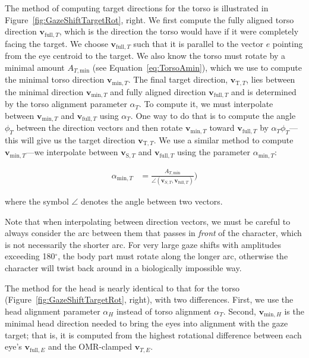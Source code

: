 The method of computing target directions for the torso is illustrated in Figure~\ref{fig:GazeShiftTargetRot}, right. We first compute the fully aligned torso direction $\mathbf{v}_{\mathrm{full},T}$, which is the direction the torso would have if it were completely facing the target. We choose $\mathbf{v}_{\mathrm{full},T}$ such that it is parallel to the vector $e$ pointing from the eye centroid to the target. We also know the torso must rotate by a minimal amount $A_{T,\mathrm{min}}$ (see Equation~\ref{eq:TorsoAmin}), which we use to compute the minimal torso direction $\mathbf{v}_{\mathrm{min},T}$. The final target direction, $\mathbf{v}_{\mathrm{T},T}$, lies between the minimal direction $\mathbf{v}_{\mathrm{min},T}$ and fully aligned direction $\mathbf{v}_{\mathrm{full},T}$ and is determined by the torso alignment parameter $\alpha_T$. To compute it, we must interpolate between $\mathbf{v}_{\mathrm{min},T}$ and $\mathbf{v}_{\mathrm{full},T}$ using $\alpha_T$. One way to do that is to compute the angle $\phi_T$ between the direction vectors and then rotate $\mathbf{v}_{\mathrm{min},T}$ toward $\mathbf{v}_{\mathrm{full},T}$ by $\alpha_T \phi_T$---this will give us the target direction $\mathbf{v}_{\mathrm{T},T}$. We use a similar method to compute $\mathbf{v}_{\mathrm{min},T}$---we interpolate between $\mathbf{v}_{\mathrm{S},T}$ and $\mathbf{v}_{\mathrm{full},T}$ using the parameter $\alpha_{\mathrm{min},T}$:

\begin{align}
\label{eq:TorsoMinRotParam}
\alpha_{\mathrm{min},T} &= \frac{A_{T,\mathrm{min}}}{\angle(\mathbf{v}_{S,T}, \mathbf{v}_{\mathrm{full},T})})
\end{align}

where the symbol $\angle$ denotes the angle between two vectors.

Note that when interpolating between direction vectors, we must be careful to always consider the arc between them that passes in \emph{front} of the character, which is not necessarily the shorter arc. For very large gaze shifts with amplitudes exceeding 180$^\circ$, the body part must rotate along the longer arc, otherwise the character will twist back around in a biologically impossible way.

The method for the head is nearly identical to that for the torso (Figure~\ref{fig:GazeShiftTargetRot}, right), with two differences. First, we use the head alignment parameter $\alpha_H$ instead of torso alignment $\alpha_T$. Second, $\mathbf{v}_{\mathrm{min},H}$ is the minimal head direction needed to bring the eyes into alignment with the gaze target; that is, it is computed from the highest rotational difference between each eye's $\mathbf{v}_{\mathrm{full},E}$ and the OMR-clamped $\mathbf{v}_{T,E}$.

